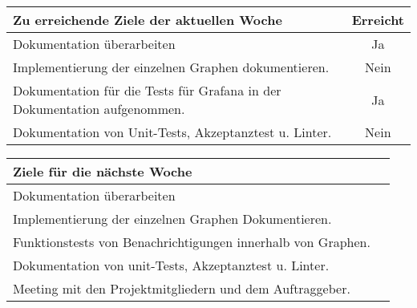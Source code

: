 \begin{tabularx}{\textwidth}{Xc}
    \arrayrulecolor{OliveGreen}
    \toprule
    {\bfseries Zu erreichende Ziele der aktuellen Woche} & {\bfseries Erreicht} \\
    \midrule[2pt]
    Dokumentation überarbeiten                              &Ja              \\
    \rowcolor{OliveGreen!15}
    Implementierung der einzelnen Graphen dokumentieren.     &Nein            \\
    \rowcolor{White}
    Dokumentation für die Tests für Grafana in der Dokumentation
    aufgenommen.      &Ja              \\
    \rowcolor{OliveGreen!15}
    Dokumentation von Unit-Tests, Akzeptanztest u. Linter.   &Nein            \\
   \bottomrule[2pt]
\end{tabularx}
%
\vspace{1cm}
%
\begin{tabularx}{\textwidth}{Xc}
    \arrayrulecolor{OliveGreen}
    \toprule
    {\bfseries Ziele für die nächste Woche}        &                         \\
    \midrule[2pt]
    Dokumentation überarbeiten                     &                         \\
    \rowcolor{OliveGreen!15}
    Implementierung der einzelnen Graphen Dokumentieren.   &                  \\
    \rowcolor{White}
    Funktionstests von Benachrichtigungen innerhalb von Graphen.  &           \\
    \rowcolor{OliveGreen!15}
    Dokumentation von unit-Tests, Akzeptanztest u. Linter. &                  \\
    \rowcolor{White}
    Meeting mit den Projektmitgliedern und dem Auftraggeber.   &              \\
\end{tabularx}
